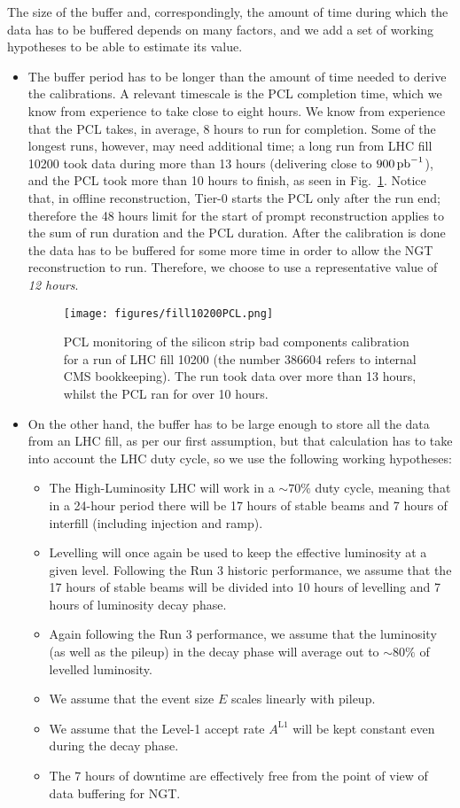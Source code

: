 The size of the buffer and, correspondingly, the amount of time during which the data has to be buffered depends on many factors, and we add a set of working hypotheses to be able to estimate its value.
\begin{itemize}
\item The buffer period has to be longer than the amount of time needed to derive the calibrations.
A relevant timescale is the PCL completion time, which we know from experience to take close to eight hours.
We know from experience that the PCL takes, in average, 8 hours to run for completion.
Some of the longest runs, however, may need additional time; a long run from LHC fill 10200 took data during more than 13 hours
(delivering close to $900\mbox{\ensuremath{\,\text{pb}^{-1}}}$), and
the PCL took more than 10 hours to finish,
as seen in Fig.~\ref{fig:fill10200PCL}.
Notice that, in offline reconstruction, Tier-0 starts the PCL only after the run end; 
therefore the 48 hours limit for the start of prompt reconstruction applies to 
the sum of run duration and the PCL duration.
After the calibration is done the data has to be buffered for some more time in order to allow the NGT reconstruction to run.
Therefore, we choose to use a representative value of \emph{12 hours}.
\begin{figure}[htbp]
   \centering
	\texttt{[image: figures/fill10200PCL.png]}
   \caption{PCL monitoring of the silicon strip bad components calibration for a run of LHC fill 10200 (the number 386604 refers to internal CMS bookkeeping).
   The run took data over more than 13 hours, whilst the PCL ran for over 10 hours.}
   \label{fig:fill10200PCL}
\end{figure}
\item On the other hand, the buffer has to be large enough to store all the data from an LHC fill, as per our first assumption,
but that calculation has to take into account the LHC duty cycle, so we use the following working hypotheses:
\begin{itemize}
\item The High-Luminosity LHC will work in a $\sim70\%$ duty cycle, meaning that in a 24-hour period there will be 17 hours of stable beams and 7 hours of interfill (including injection and ramp).
\item Levelling will once again be used to keep the effective luminosity at a given level.
Following the Run 3 historic performance, we assume that the 17 hours of stable beams will be divided into 10 hours of levelling and 7 hours of luminosity decay phase.
\item Again following the Run 3 performance, we assume that the luminosity (as well as the pileup) in the decay phase will average out to $\sim80\%$ of levelled luminosity.
\item We assume that the event size $E$ scales linearly with pileup.
\item We assume that the Level-1 accept rate $A^{\text{L1}}$ will be kept constant even during the decay phase. 
\item The 7 hours of downtime are effectively free from the point of view of data buffering for NGT.
\end{itemize}
\end{itemize}

